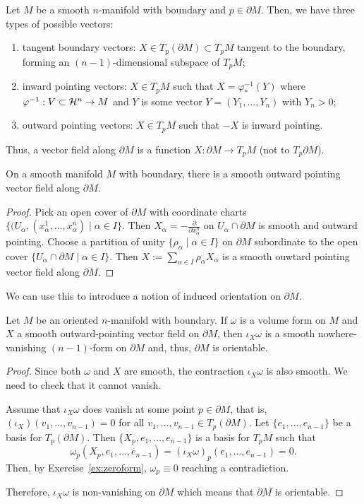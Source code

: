 Let $M$ be a smooth $n$-manifold with boundary and $p\in \partial M$.
Then, we have three types of possible vectors:
\begin{enumerate}
  \item tangent boundary vectors: $X\in T_p(\partial M)\subset T_p M$ tangent to the boundary, forming an $(n-1)$-dimensional subspace of $T_p M$;
  \item inward pointing vectors: $X\in T_pM$ such that $X = \varphi^{-1}_*(Y)$ where $\varphi^{-1}: V\subset \mathcal{H}^n \to M$ and $Y$ is some vector $Y = (Y_1, \ldots, Y_n)$ with $Y_n > 0$;
  \item outward pointing vectors: $X\in T_pM$ such that $-X$ is inward pointing.
\end{enumerate}
Thus, a vector field along $\partial M$ is a function $X:\partial M\to T_pM$ (not to $T_p\partial M$).

\begin{proposition}
  On a smooth manifold $M$ with boundary, there is a smooth outward pointing vector field along $\partial M$.  
\end{proposition}
\begin{proof}
  Pick an open cover of $\partial M$ with coordinate charts $\{(U_\alpha, (x^1_\alpha,\ldots,x^n_\alpha) \mid \alpha\in I\}$. Then $X_\alpha = -\frac{\partial}{\partial x^n_\alpha}$ on $U_\alpha\cap \partial M$ is smooth and outward pointing.
  Choose a partition of unity $\{\rho_\alpha \mid \alpha\in I\}$ on $\partial M$ subordinate to the open cover $\{U_\alpha\cap \partial M \mid \alpha\in I\}$.
  Then $X:= \sum_{\alpha\in I}\rho_\alpha X_\alpha$ is a smooth ouwtard pointing vector field along $\partial M$.
\end{proof}

We can use this to introduce a notion of induced orientation on $\partial M$.

\begin{proposition}
  Let $M$ be an oriented $n$-manifold with boundary.
  If $\omega$ is a volume form on $M$ and $X$ a smooth outward-pointing vector field on $\partial M$, then $\iota_X\omega$ is a smooth nowhere-vanishing $(n-1)$-form on $\partial M$ and, thus, $\partial M$ is orientable.
\end{proposition}
\begin{proof}
  Since both $\omega$ and $X$ are smooth, the contraction $\iota_X\omega$ is also smooth.
  We need to check that it cannot vanish.

  Assume that $\iota_X\omega$ does vanish at some point $p\in\partial M$, that is, $(\iota_X)(v_1, \ldots, v_{n-1}) = 0$ for all $v_1, \ldots, v_{n-1}\in T_p(\partial M)$.
  Let $\{e_1,\ldots,e_{n-1}\}$ be a basis for $T_p(\partial M)$.
  Then $\{X_p,e_1,\ldots,e_{n-1}\}$ is a basis for $T_p M$ such that
  \begin{equation}
    \omega_p(X_p, e_1, \ldots, e_{n-1}) = (\iota_X\omega)_p(e_1, \ldots, e_{n-1}) = 0.
  \end{equation}
  Then, by Exercise~\ref{ex:zeroform}, $\omega_p\equiv0$ reaching a contradiction.
  
  Therefore, $\iota_X\omega$ is non-vanishing on $\partial M$ which means that $\partial M$ is orientable.
\end{proof}

